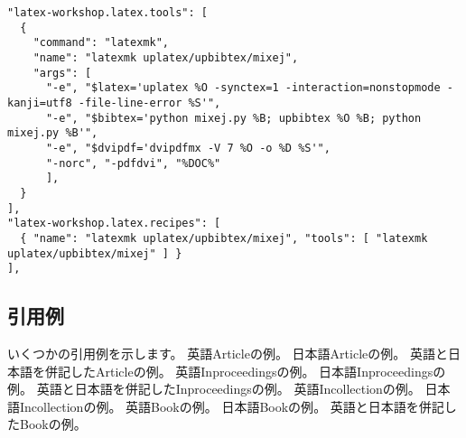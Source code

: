 \documentclass[11pt, a4paper, dvipdfmx, uplatex]{jsarticle}
\begin{document}
\noindent\makebox[\linewidth]{\rule{\linewidth}{0.4pt}}\vspace{-0.5zw}
\begin{lstlisting}[style=onecol]
"latex-workshop.latex.tools": [
  {
    "command": "latexmk",
    "name": "latexmk uplatex/upbibtex/mixej",
    "args": [
      "-e", "$latex='uplatex %O -synctex=1 -interaction=nonstopmode -kanji=utf8 -file-line-error %S'",
      "-e", "$bibtex='python mixej.py %B; upbibtex %O %B; python mixej.py %B'",
      "-e", "$dvipdf='dvipdfmx -V 7 %O -o %D %S'",
      "-norc", "-pdfdvi", "%DOC%"
      ],
  }
],
"latex-workshop.latex.recipes": [
  { "name": "latexmk uplatex/upbibtex/mixej", "tools": [ "latexmk uplatex/upbibtex/mixej" ] }
],
\end{lstlisting}\vspace{-1.8zw}
\noindent\makebox[\linewidth]{\rule{\linewidth}{0.4pt}}\vspace{0.5zw}\par


\subsection{引用例}

いくつかの引用例を示します。
英語Articleの例\cite{enArticle1}。
日本語Articleの例\cite{jpArticle1}。
英語と日本語を併記したArticleの例\cite{enArticle2/ej/jpArticle2,enArticle3/ej/jpArticle3}。
英語Inproceedingsの例\cite{enInproceedings1}。
日本語Inproceedingsの例\cite{jpInproceedings1}。
英語と日本語を併記したInproceedingsの例\cite{enInproceedings2/ej/jpInproceedings2}。
英語Incollectionの例\cite{enIncollection1}。
日本語Incollectionの例\cite{jpIncollection1,jpIncollection2}。
英語Bookの例\cite{enBook1}。
日本語Bookの例\cite{jpBook1,jpBook2,jpBook3}。
英語と日本語を併記したBookの例\cite{enjBook1/ej/jpjBook1}。


\end{document}
